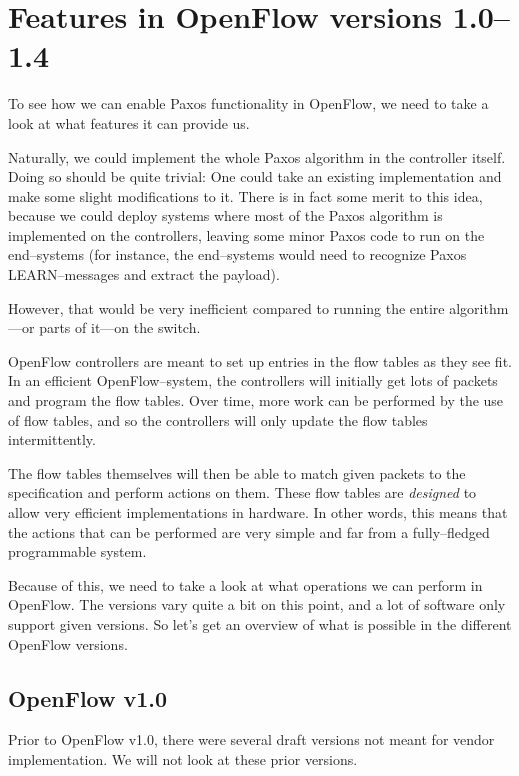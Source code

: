 \section{Features in OpenFlow versions 1.0--1.4}

To see how we can enable Paxos functionality in OpenFlow, we need to take a
look at what features it can provide us.

Naturally, we could implement the whole Paxos algorithm in the controller
itself.  Doing so should be quite trivial: One could take an existing
implementation and make some slight modifications to it.  There is in fact
some merit to this idea, because we could deploy systems where most of the
Paxos algorithm is implemented on the controllers, leaving some minor Paxos
code to run on the end--systems (for instance, the end--systems would need
to recognize Paxos LEARN--messages and extract the payload).

However, that would be very inefficient compared to running the entire
algorithm---or parts of it---on the switch.

OpenFlow controllers are meant to set up entries in the flow tables as they
see fit.  In an efficient OpenFlow--system, the
controllers will initially get lots of packets and program the flow tables.
Over time, more work can be performed by the use of flow tables, and so the
controllers will only update the flow tables intermittently.

The flow tables themselves will then be able to match given
packets to the specification and perform actions on them.  These flow tables
are {\em designed} to allow very efficient implementations in hardware.  In
other words, this means that the actions that can be performed are very
simple and far from a fully--fledged programmable system.

Because of this, we need to take a look at what operations we can perform in
OpenFlow.  The versions vary quite a bit on this point, and a lot of
software only support given versions.  So let's get an overview of what is
possible in the different OpenFlow versions.

\subsection{OpenFlow v1.0}

Prior to OpenFlow v1.0\cite{openflow-1.0.0}, there were several draft
versions not meant for vendor implementation.  We will not look at these
prior versions.

